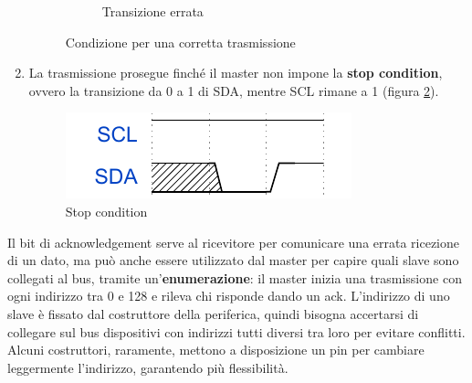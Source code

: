 \documentclass[11pt,4paper]{report}
\begin{document}
\begin{enumerate}
\begin{figure}[H]
\begin{subfigure}{.5\textwidth}
			\caption{Transizione errata}
		\end{subfigure}
	\caption{Condizione per una corretta trasmissione}
	\label{fig:iic_transition}
	\end{figure}
	\item La trasmissione prosegue finché il master non impone la \textbf{stop condition}, ovvero la transizione da 0 a 1 di SDA, mentre SCL rimane a 1 (figura \ref{fig:iic_stop}).
	\begin{figure}[H]
		\centering
		\includegraphics[width=0.3\linewidth]{seriali/stop_condition}
		\caption{Stop condition}
		\label{fig:iic_stop}
	\end{figure}
\end{enumerate}
Il bit di acknowledgement serve al ricevitore per comunicare una errata ricezione di un dato, ma può anche essere utilizzato dal master per capire quali slave sono collegati al bus, tramite un'\textbf{enumerazione}: il master inizia una trasmissione con ogni indirizzo tra 0 e 128 e rileva chi risponde dando un ack. L'indirizzo di uno slave è fissato dal costruttore della periferica, quindi bisogna accertarsi di collegare sul bus dispositivi con indirizzi tutti diversi tra loro per evitare conflitti. Alcuni costruttori, raramente, mettono a disposizione un pin per cambiare leggermente l'indirizzo, garantendo più flessibilità.
\end{document}
